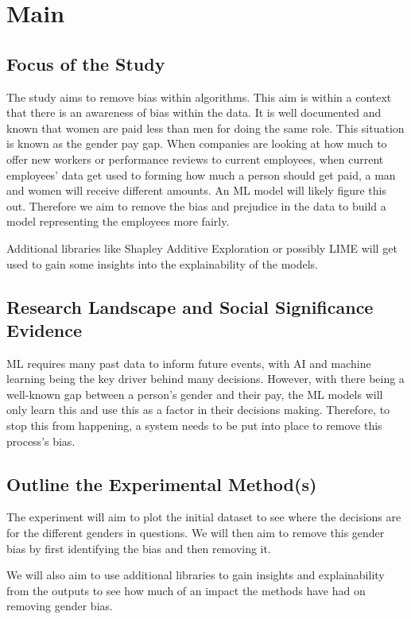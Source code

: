 \documentclass{sigchi}
\begin{document}
\section{Main}

\subsection{Focus of the Study}
The study aims to remove bias within algorithms. This aim is within a context that there is an awareness of bias within the data. It is well documented and known that women are paid less than men for doing the same role. This situation is known as the gender pay gap. When companies are looking at how much to offer new workers or performance reviews to current employees, when current employees' data get used to forming how much a person should get paid, a man and women will receive different amounts. An ML model will likely figure this out. Therefore we aim to remove the bias and prejudice in the data to build a model representing the employees more fairly.

Additional libraries like Shapley Additive Exploration or possibly LIME will get used to gain some insights into the explainability of the models.
 

\subsection{Research Landscape and Social Significance Evidence}
ML requires many past data to inform future events, with AI and machine learning being the key driver behind many decisions. However, with there being a well-known gap between a person's gender and their pay, the ML models will only learn this and use this as a factor in their decisions making. Therefore, to stop this from happening, a system needs to be put into place to remove this process's bias. %


\subsection{Outline the Experimental Method(s)}
The experiment will aim to plot the initial dataset to see where the decisions are for the different genders in questions. We will then aim to remove this gender bias by first identifying the bias and then removing it. 

We will also aim to use additional libraries to gain insights and explainability from the outputs to see how much of an impact the methods have had on removing gender bias.
\end{document}
